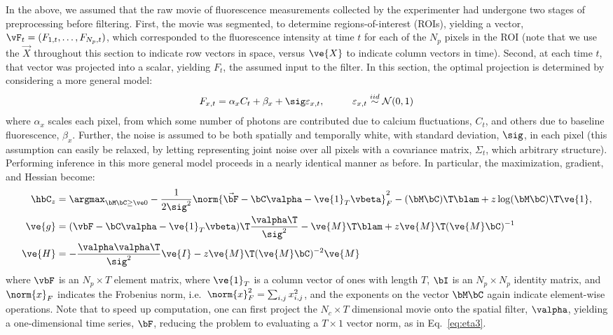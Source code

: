 In the above, we assumed that the raw movie of fluorescence measurements collected by the experimenter had undergone two stages of preprocessing before filtering.  First, the movie was segmented, to determine regions-of-interest (ROIs), yielding a vector, $\vF_t=(F_{1,t}, \ldots, F_{N_p,t})$, which corresponded to the fluorescence intensity at time $t$ for each of the $N_p$ pixels in the ROI (note that we use the $\vec{X}$ throughout this section to indicate row vectors in space, versus $\ve{X}$ to indicate column vectors in time).  Second, at each time $t$, that vector was projected into a scalar, yielding $F_t$, the assumed input to the filter.  In this section, the optimal projection is determined by considering a more general model:
\begin{align} \label{eq:bF}
F_{x,t} &= \alpha_x C_t + \beta_x +  \sig \varepsilon_{x,t}, \qquad &\varepsilon_{x,t} \overset{iid}{\sim} \mathcal{N}(0,1)   
\end{align}
\noindent where $\alpha_x$ scales each pixel, from which some number of photons are contributed due to calcium fluctuations, $C_t$, and others due to baseline fluorescence, $\beta_x$.  Further, the noise is assumed to be both spatially and temporally white, with standard deviation, $\sig$, in each pixel (this assumption can easily be relaxed, by letting representing joint noise over all pixels with a covariance matrix, $\Sigma_{t}$, which arbitrary structure).  Performing inference in this more general model proceeds in a  nearly identical manner as before. In particular, the maximization, gradient, and Hessian become:
\begin{align} 
\hbC_{\zzz} 
&= \az  -\frac{1}{2 \sig^2} \norm{\vec{\bF} - \bC \valpha - \ve{1}_T \vbeta}_F^2 - (\bM \bC )\T \blam  + \zzz \log(\bM \bC)\T\ve{1},  \label{eq:eta4}\\
\ve{g} &= (\vbF - \bC \valpha - \ve{1}_T \vbeta)\T\frac{\valpha\T}{\sig^2} - \ve{M}\T\blam + \zzz \ve{M}\T (\ve{M} \bC)^{-1} \label{eq:g2} \\
\ve{H} &= -\frac{\valpha \valpha\T}{\sig^2} \ve{I} - \zzz \ve{M}\T (\ve{M} \bC)^{-2} \ve{M} \label{eq:H2}
\end{align}
\noindent where $\vbF$ is an $N_p \times T$ element matrix, where $\ve{1}_T$ is a column vector of ones with length $T$, $\bI$ is an $N_p \times N_p$ identity matrix, and $\norm{x}_F$ indicates the Frobenius norm, i.e.\ $\norm{x}_F^2= \sum_{i,j} x_{i,j}^2$, and the exponents on the vector $\bM\bC$ again indicate element-wise operations.  Note that to speed up computation, one can first project the $N_c \times T$ dimensional movie onto the spatial filter, $\valpha$, yielding a one-dimensional time series, $\bF$, reducing the problem to evaluating a $T \times 1$ vector norm, as in Eq.~\eqref{eq:eta3}.

